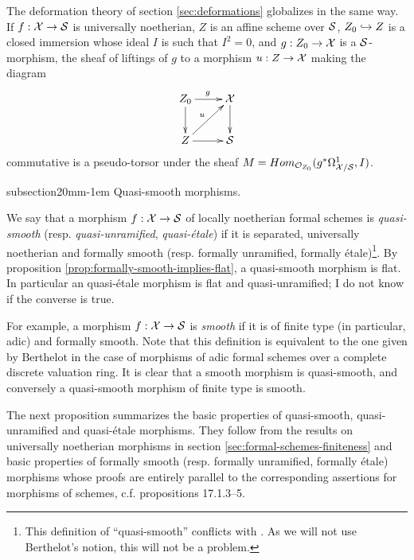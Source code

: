 \documentclass{article}
\makeatletter
\theoremstyle{change}
\renewcommand{\subsection}{\@startsection%
{subsection}{2}{0mm}{\baselineskip}{-1em}%
{\normalfont\normalsize\bfseries}}
\numberwithin{equation}{subsubsection}
\makeatother
\begin{document}
The deformation theory of section \ref{sec:deformations} globalizes in
the same way. If $f:{\cal X}\to{\cal S}$ is universally noetherian, $Z$ is an
affine scheme over ${\cal S}$, $Z_0\hookrightarrow Z$ is a closed immersion whose
ideal $I$ is such that $I^2=0$, and $g:Z_0\to{\cal X}$ is a ${\cal S}$-morphism,
the sheaf of liftings of $g$ to a morphism $u:Z\to{\cal X}$ making the
diagram
\begin{equation}
  \label{eq:formal-smooth-diagram2}
  \xymatrix{
    Z_0\ar[r]^g\ar[d]&\cX\ar[d]\\
    Z\ar[r]\ar[ur]^u&\cS
  }  
\end{equation}
commutative is a pseudo-torsor under the sheaf
$M=Hom_{{\cal O}_{Z_0}}(g^*\Omega^1_{{\cal X}/{\cal S}},I)$. 

\subsection{Quasi-smooth morphisms.}
\label{sec:smooth-formal-case}

We say that a morphism $f:{\cal X}\to{\cal S}$ of locally noetherian formal
schemes is \textit{quasi-smooth} (resp. \textit{quasi-unramified},
\textit{quasi-\'etale}) if it is separated, universally noetherian and
formally smooth (resp. formally unramified, formally
\'etale)\footnote{This definition of ``quasi-smooth'' conflicts with
  \cite[Ch. IV 1.5.1]{berthelot:1974}. As we will not use Berthelot's
  notion, this will not be a problem.}. By proposition
\ref{prop:formally-smooth-implies-flat}, a quasi-smooth morphism is
flat. In particular an quasi-\'etale morphism is flat and
quasi-unramified; I do not know if the converse is true.

For example, a morphism $f:{\cal X}\to{\cal S}$ is \textit{smooth} if it is of
finite type (in particular, adic) and formally smooth. Note that this
definition is equivalent to the one given by Berthelot
\cite[2.1.5]{berthelot:1996} in the case of morphisms of adic formal
schemes over a complete discrete valuation ring. It is clear
that a smooth morphism is quasi-smooth, and conversely a quasi-smooth
morphism of finite type is smooth. 

The next proposition summarizes the basic properties of quasi-smooth,
quasi-unramified and quasi-\'etale morphisms. They follow from the
results on universally noetherian morphisms in section
\ref{sec:formal-schemes-finiteness} and basic properties of formally
smooth (resp. formally unramified, formally \'etale) morphisms whose
proofs are entirely parallel to the corresponding assertions for
morphisms of schemes, c.f. \cite[\S17]{EGA} propositions 17.1.3--5.
\end{document}
